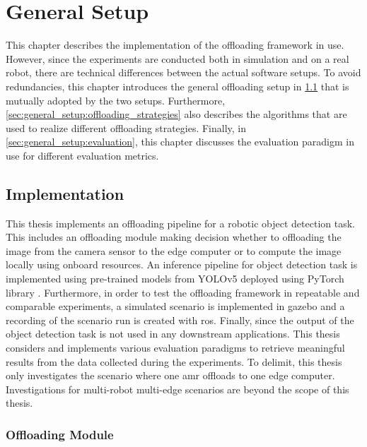\chapter{General Setup}\label{ch:general_setup}

This chapter describes the implementation of the offloading framework in use. However, since the experiments are conducted both in simulation and on a real robot, there are technical differences between the actual software setups. To avoid redundancies, this chapter introduces the general offloading setup in \cref{sec:general_setup:implementation} that is mutually adopted by the two setups. Furthermore, \cref{sec:general_setup:offloading_strategies} also describes the algorithms that are used to realize different offloading strategies.   
Finally, in \cref{sec:general_setup:evaluation}, this chapter discusses the evaluation paradigm in use for different evaluation metrics.

\section{Implementation}\label{sec:general_setup:implementation}

This thesis implements an offloading pipeline for a robotic object detection task. This includes an offloading module making decision whether to offloading the image from the camera sensor to the edge computer or to compute the image locally using onboard resources. An inference pipeline for object detection task is implemented using pre-trained models from YOLOv5 \cite{Jocher2022} deployed using PyTorch library \cite{Paszke2019}. Furthermore, in order to test the offloading framework in repeatable and comparable experiments, a simulated scenario is implemented in \gls{gazebo} \cite{Koenig2004} and a recording of the scenario run is created with \gls{ros}. Finally, since the output of the object detection task is not used in any downstream applications. This thesis considers and implements various evaluation paradigms to retrieve meaningful results from the data collected during the experiments. To delimit, this thesis only investigates the scenario where one \gls{amr} offloads to one edge computer. Investigations for multi-robot multi-edge scenarios are beyond the scope of this thesis. 

\subsection{Offloading Module}

